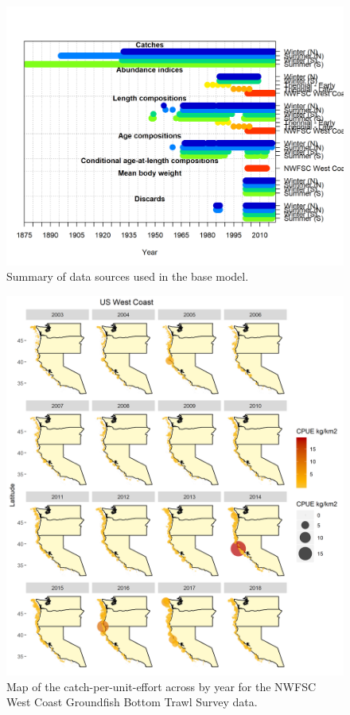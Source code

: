 \documentclass[12pt,]{article}
\begin{document}
\begin{figure}
\centering
\includegraphics{r4ss/plots_mod1/data_plot.png}
\caption{Summary of data sources used in the base model.
\label{fig:data_plot}}
\end{figure}

\FloatBarrier

\begin{figure}
\centering
\includegraphics{Figures/NWFSC_CPUE_Map_Year.png}
\caption{Map of the catch-per-unit-effort across by year for the NWFSC
West Coast Groundfish Bottom Trawl Survey data. \label{fig:nw_map}}
\end{figure}
\end{document}
